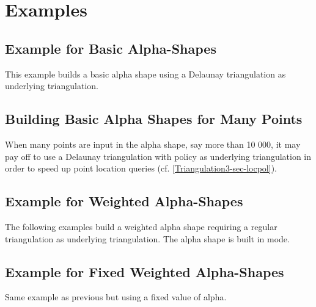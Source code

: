 
\section{Examples}
\subsection{Example for Basic Alpha-Shapes\label{I1_SectClassicAS3D}}

This example builds a basic alpha shape using a  Delaunay triangulation
as underlying triangulation.




\subsection{Building Basic Alpha Shapes for Many Points}
When many points are input in the alpha shape, say more than 10 000,
it may pay off to use a Delaunay triangulation with 
policy as underlying triangulation in order to speed up point location
queries (cf. \ref{Triangulation3-sec-locpol}).


\subsection{Example for Weighted Alpha-Shapes\label{I1_SectWeightedAS3D}}

The following examples build a weighted alpha shape requiring a
regular triangulation as underlying triangulation.
The alpha shape is built in  mode.



\subsection{Example for Fixed Weighted Alpha-Shapes\label{I1_SectFxWeightedAS3D}}

Same example as previous but using a fixed value of alpha.



